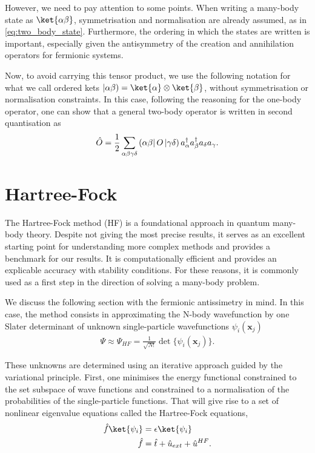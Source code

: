 However, we need to pay attention to some points. When writing a many-body state as $\ket{\alpha\beta}$, symmetrisation and normalisation are already assumed, as in \eqref{eq:two_body_state}. Furthermore, the ordering in which the states are written is important, especially given the antisymmetry of the creation and annihilation operators for fermionic systems.

Now, to avoid carrying this tensor product, we use the following notation for what we call ordered kets $\oket{\alpha\beta} = \ket{\alpha}\otimes \ket{\beta}$, without symmetrisation or normalisation constraints. In this case, following the reasoning for the one-body operator, one can show that a general two-body operator is written in second quantisation as 
\begin{align*}
    \hat{O} = \frac{1}{2} \sum_{\alpha\beta\gamma\delta}\left({\alpha \beta}\right| O \left|{\gamma \delta}\right)a^\dagger_\alpha a^\dagger_\beta a_\delta a_\gamma.
\end{align*}

\section{Hartree-Fock}

The Hartree-Fock method (HF) is a foundational approach in quantum many-body theory. Despite not giving the most precise results, it serves as an excellent starting point for understanding more complex methods and provides a benchmark for our results. It is computationally efficient and provides an explicable accuracy with stability conditions. For these reasons, it is commonly used as a first step in the direction of solving a many-body problem.

We discuss the following section with the fermionic antissimetry in mind. In this case, the method consists in approximating the N-body wavefunction by one Slater determinant of unknown single-particle wavefunctions $\psi_i(\mathbf{x}_j)$
\begin{align*}
    \Psi \approx \Psi_{HF} = \frac{1}{\sqrt{N!}} \det{\{\psi_i(\mathbf{x}_j)\}}.
\end{align*}

These unknowns are determined using an iterative approach guided by the variational principle. First, one minimises the energy functional constrained to the set subspace of wave functions and constrained to a normalisation of the probabilities of the single-particle functions. That will give rise to a set of nonlinear eigenvalue equations called the Hartree-Fock equations,
\begin{align}
    \hat{f}\ket{\psi_i} &= \epsilon \ket{\psi_i} \label{eq:hf_eq}\\
    \hat{f} &= \hat{t} + \hat{u}_{ext} + \hat{u}^{HF} .
    \notag
\end{align}

